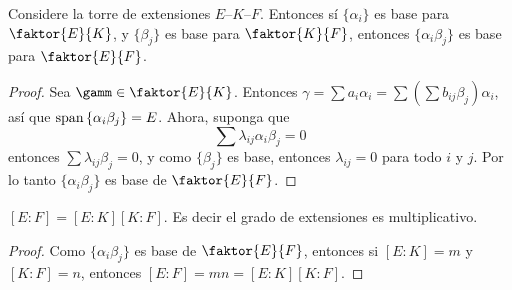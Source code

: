 \begin{lemma}\label{19.83}
    Considere la torre de extensiones $E$--$K$--$F$. Entonces s\'i $\{\alpha_i\}$
    es base para $\faktor{E}{K}$, y $\{\beta_j\}$ es base para $\faktor{K}{F}$,
    entonces $\{\alpha_i\beta_j\}$ es base para $\faktor{E}{F}$.
\end{lemma}
\begin{proof}
    Sea $\gamm \in \faktor{E}{K}$. Entonces
    $\gamma=\sum{a_i\alpha_i}=\sum{(\sum{b_{ij}\beta_j})\alpha_i}$, as\'i que
    $\operatorname{span}{\{\alpha_i\beta_j\}}=E$. Ahora, suponga que
    \begin{equation*}
        \sum{\lambda_{ij}\alpha_i\beta_j}=0
    \end{equation*}
    entonces $\sum{\lambda_{ij}\beta_j}=0$, y como $\{\beta_j\}$ es base,
    entonces $\lambda_{ij}=0$ para todo $i$ y  $j$. Por lo tanto
    $\{\alpha_i\beta_j\}$ es base de $\faktor{E}{F}$.
\end{proof}
\begin{corollary}
    $[E:F]=[E:K][K:F]$. Es decir el grado de extensiones es multiplicativo.
\end{corollary}
\begin{proof}
    Como $\{\alpha_i\beta_j\}$ es base de $\faktor{E}{F}$, entonces si $[E:K]=m$
    y $[K:F]=n$, entonces $[E:F]=mn=[E:K][K:F]$.
\end{proof}

